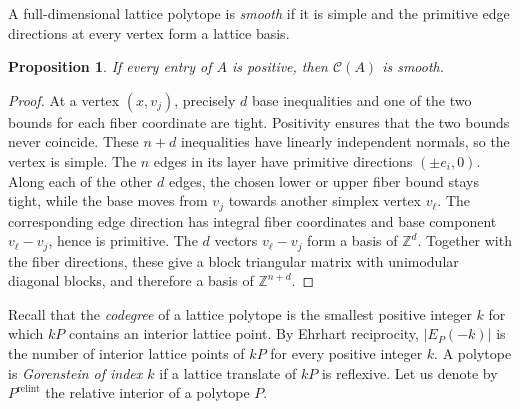 \documentclass[11pt, letterpaper, english]{amsart}
\theoremstyle{teoremas}
\newtheorem{proposition}[theorem]{Proposition}
\theoremstyle{definition}
\newcommand{\Z}{\mathbb{Z}}
\newcommand{\cC}{\mathcal C}
\begin{document}
A full-dimensional lattice polytope is \emph{smooth} if it is simple
and the primitive edge directions at every vertex form a lattice basis.

\begin{proposition}\label{prop:smooth}
If every entry of $A$ is positive, then $\cC(A)$ is smooth.
\end{proposition}
\begin{proof}
At a vertex $(x,v_j)$, precisely $d$ base inequalities and one of the
two bounds for each fiber coordinate are tight. Positivity ensures
that the two bounds never coincide. These $n+d$ inequalities have
linearly independent normals, so the vertex is simple. The $n$ edges
in its layer have primitive directions $(\pm e_i,0)$. Along each of
the other $d$ edges, the chosen lower or upper fiber bound stays tight,
while the base moves from $v_j$ towards another simplex vertex $v_\ell$.
The corresponding edge direction has integral fiber coordinates and
base component $v_\ell-v_j$, hence is primitive. The $d$ vectors
$v_\ell-v_j$ form a basis of $\Z^d$. Together with the fiber directions,
these give a block triangular matrix with unimodular diagonal blocks,
and therefore a basis of $\Z^{n+d}$.
\end{proof}

Recall that the \emph{codegree} of a lattice polytope is the smallest
positive integer $k$ for which $kP$ contains an interior lattice point.
By Ehrhart reciprocity, $|E_P(-k)|$ is the number of interior
lattice points of $kP$ for every positive integer $k$.
A polytope is \emph{Gorenstein of index $k$} if a lattice translate
of $kP$ is reflexive. Let us denote by $P^{\operatorname{relint}}$ the relative interior of a polytope $P$.
\end{document}
